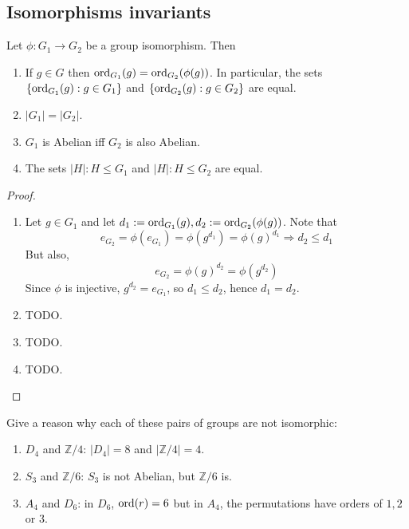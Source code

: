 \subsection{Isomorphisms invariants}

\begin{lemma}
	Let $\phi: G_1 \rightarrow G_2$ be a group isomorphism. Then
	\begin{enumerate}
		\item If $g \in G$ then $\text{ord}_{G_1}(g) = \text{ord}_{G_2}(\phi(g))$. In particular, the sets $\{ \text{ord}_{G_1}(g): g \in G_1 \}$ and $\{ \text{ord}_{G_2}(g): g \in G_2 \}$ are equal.
		\item $|G_1| = |G_2|$.
		\item $G_1$ is Abelian iff $G_2$ is also Abelian.
		\item The sets $|H|: H \le G_1$ and $|H|: H \le G_2$ are equal.
	\end{enumerate}
\end{lemma}

\begin{proof}
	\hfill
	\begin{enumerate}
		\item Let $g \in G_1$ and let $d_1 := \text{ord}_{G_1}(g), d_2 := \text{ord}_{G_2}(\phi(g))$. Note that
		\[
			e_{G_2} = \phi(e_{G_1}) = \phi(g^{d_1}) = \phi(g)^{d_1} \Longrightarrow d_2 \le d_1
		\]
		But also,
		\[
			e_{G_2} = \phi(g)^{d_2} = \phi(g^{d_2})
		\]
		Since $\phi$ is injective, $g^{d_2} = e_{G_1}$, so $d_1 \le d_2$, hence $d_1 = d_2$.
		\item TODO.
		\item TODO.
		\item TODO.
	\end{enumerate}
\end{proof}

\begin{example}
	Give a reason why each of these pairs of groups are not isomorphic:
	\begin{enumerate}
		\item $D_4$ and $\mathbb{Z} / 4$: $|D_4| = 8$ and $|\mathbb{Z} / 4| = 4$.
		\item $S_3$ and $\mathbb{Z} / 6$: $S_3$ is not Abelian, but $\mathbb{Z} / 6$ is.
		\item $A_4$ and $D_6$: in $D_6$, $\text{ord}(r) = 6$ but in $A_4$, the permutations have orders of $1, 2$ or $3$.
	\end{enumerate}
\end{example}

